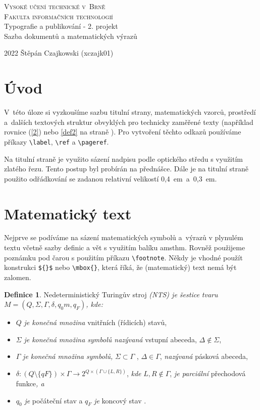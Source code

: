 \documentclass[a4paper,11pt]{article}
\theoremstyle{definition}
\newtheorem{theorem}{Definice}
\begin{document}
\begin{center}
\thispagestyle{empty}
\setcounter{page}{0}
\Huge
\textsc{Vysoké učení technické v~Brně \\ \huge Fakulta informačních technologií}\\
\huge Typografie a publikování - 2. projekt \\
Sazba dokumentů a matematických výrazů
\end{center}
{\large 2022 \hfill
Štěpán Czajkowski (xczajk01)}

\twocolumn
\section*{Úvod}

V~této úloze si vyzkoušíme sazbu titulní strany, matematických vzorců, prostředí a~dalších textových struktur obvyklých pro technicky zaměřené texty (například rovnice (\ref{2}) nebo \ref{def2} na straně \pageref{1}). Pro vytvoření těchto odkazů používáme příkazy \verb|\label|, \verb|\ref| a \verb|\pageref|.

Na titulní straně je využito sázení nadpisu podle optického středu s využitím zlatého řezu. Tento postup byl probírán na přednášce. Dále je na titulní straně použito odřádkování se zadanou relativní velikostí 0,4~em~a~0,3~em.


\section{Matematický text}

Nejprve se podíváme na sázení matematických symbolů a~výrazů v plynulém textu včetně sazby definic a vět s využitím balíku amsthm. Rovněž použijeme poznámku pod čarou s použitím příkazu \verb|\footnote|. Někdy je vhodné použít konstrukci \verb|${}$| nebo \verb|\mbox{}|, která říká, že (matematický) text nemá být zalomen. 

\begin{theorem} Nedeterministický Turingův stroj \textit{(NTS) je šestice tvaru} $M =(Q, \Sigma, \Gamma, \delta, q_0m, q_F )$\textit{, kde:}
\begin{itemize}
\item $Q$ \emph{je konečná množina} vnitřních (řídicích) stavů,

\item $\Sigma$ \emph{je konečná množina symbolů nazývaná} vstupní abeceda, $\Delta \notin \Sigma$,

\item $\Gamma$ \emph{je konečná množina symbolů,} $\Sigma \subset \Gamma$ , $\Delta \in \Gamma$, \emph{nazývaná} pásková abeceda,

\item $\delta: (Q\setminus \{qF\}) \times \Gamma \rightarrow 2^{Q\times(\Gamma \cup \{L,R\})}$, \emph{kde} $L,R \notin \Gamma$, \emph{je parciální} přechodová funkce\emph{, a}

\item $q_0$ \emph{je} počáteční stav a $q_F$ \emph{je} koncový stav
.
\end{itemize}
\end{theorem} 
\end{document}
